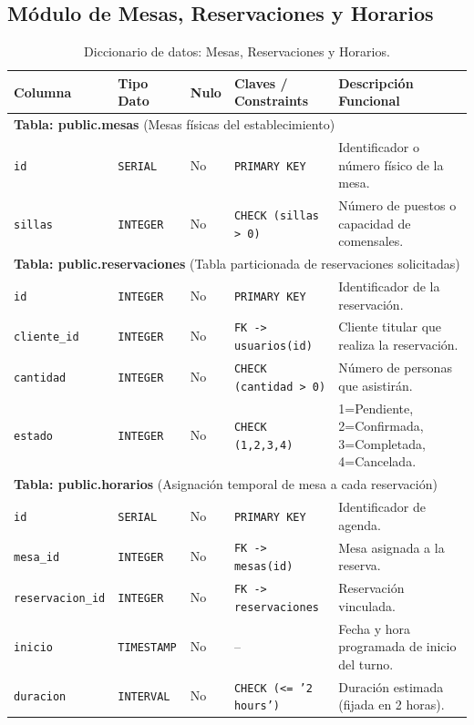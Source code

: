 \documentclass[11pt,letterpaper]{article}
\begin{document}
\newpage
\subsection{Módulo de Mesas, Reservaciones y Horarios}

\begin{table}[h!]
\centering
\scriptsize
\begin{tabularx}{\textwidth}{l l l p{2.8cm} X}
\toprule
\textbf{Columna} & \textbf{Tipo Dato} & \textbf{Nulo} & \textbf{Claves / Constraints} & \textbf{Descripción Funcional} \\
\midrule
\multicolumn{5}{l}{\textbf{Tabla: public.mesas} (Mesas físicas del establecimiento)} \\
\texttt{id} & \texttt{SERIAL} & No & \texttt{PRIMARY KEY} & Identificador o número físico de la mesa. \\
\texttt{sillas} & \texttt{INTEGER} & No & \texttt{CHECK (sillas > 0)} & Número de puestos o capacidad de comensales. \\
\midrule
\multicolumn{5}{l}{\textbf{Tabla: public.reservaciones} (Tabla particionada de reservaciones solicitadas)} \\
\texttt{id} & \texttt{INTEGER} & No & \texttt{PRIMARY KEY} & Identificador de la reservación. \\
\texttt{cliente\_id} & \texttt{INTEGER} & No & \texttt{FK -> usuarios(id)} & Cliente titular que realiza la reservación. \\
\texttt{cantidad} & \texttt{INTEGER} & No & \texttt{CHECK (cantidad > 0)} & Número de personas que asistirán. \\
\texttt{estado} & \texttt{INTEGER} & No & \texttt{CHECK (1,2,3,4)} & 1=Pendiente, 2=Confirmada, 3=Completada, 4=Cancelada. \\
\midrule
\multicolumn{5}{l}{\textbf{Tabla: public.horarios} (Asignación temporal de mesa a cada reservación)} \\
\texttt{id} & \texttt{SERIAL} & No & \texttt{PRIMARY KEY} & Identificador de agenda. \\
\texttt{mesa\_id} & \texttt{INTEGER} & No & \texttt{FK -> mesas(id)} & Mesa asignada a la reserva. \\
\texttt{reservacion\_id} & \texttt{INTEGER} & No & \texttt{FK -> reservaciones} & Reservación vinculada. \\
\texttt{inicio} & \texttt{TIMESTAMP} & No & -- & Fecha y hora programada de inicio del turno. \\
\texttt{duracion} & \texttt{INTERVAL} & No & \texttt{CHECK (<= '2 hours')} & Duración estimada (fijada en 2 horas). \\
\bottomrule
\end{tabularx}
\caption{Diccionario de datos: Mesas, Reservaciones y Horarios.}
\label{tab:dict_mesas_reservas}
\end{table}
\end{document}
